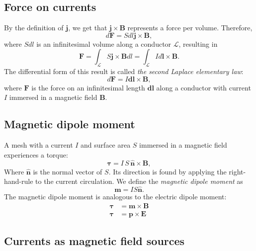 \documentclass[a4paper, 12pt]{article}
\renewcommand{\vec}[1]{\bm{#1}}
\newcommand{\E}{\ensuremath{\vec{E}}}
\renewcommand{\j}{\ensuremath{\vec{j}}}
\newcommand{\B}{\ensuremath{\vec{B}}}
\let\tmp\hat
\renewcommand{\hat}[1]{\vec{\tmp{#1}}}
\begin{document}
    \subsection{Force on currents}
        By the definition of \j, we get that $\j \times \B$ represents a force per volume. Therefore, 
        \begin{equation}
            d\vec{F} = S dl \j \times \B, 
        \end{equation}
        where $S dl$ is an infinitesimal volume along a conductor $\mathcal{L}$, resulting in 
        \begin{equation}
            \vec{F} = \int_\mathcal{L} S \j \times \B dl = \int_\mathcal{L} I d\vec{l} \times \B.
        \end{equation}
        The differential form of this result is called \textit{the second Laplace elementary law}:
        \begin{equation}
            d\vec{F} = I\vec{dl} \times \B,
        \end{equation}
        where $\vec{F}$ is the force on an infinitesimal length $\vec{dl}$ along a conductor with current $I$ 
        immersed in a magnetic field $\B$.
        
    \subsection{Magnetic dipole moment}
    
        A mesh with a current $I$ and surface area $S$ immersed in a magnetic field experiences a torque:
        \begin{equation}
            \vec{\tau} = I\,S\,\hat{n}\times\B,
        \end{equation}
        Where $\hat{n}$ is the normal vector of $S$. Its direction is found by applying the right-hand-rule to the current circulation. 
        We define the \textit{magnetic dipole moment} as
        \begin{equation}
            \vec{m} = IS\hat{n}.
        \end{equation}
        The magnetic dipole moment is analogous to the electric dipole moment: 
        \begin{align*}
            \vec{\tau} &= \vec{m} \times \B\\
            \vec{\tau} &= \vec{p} \times \E
        \end{align*}
    
    \subsection{Currents as magnetic field sources}
    
\end{document}
